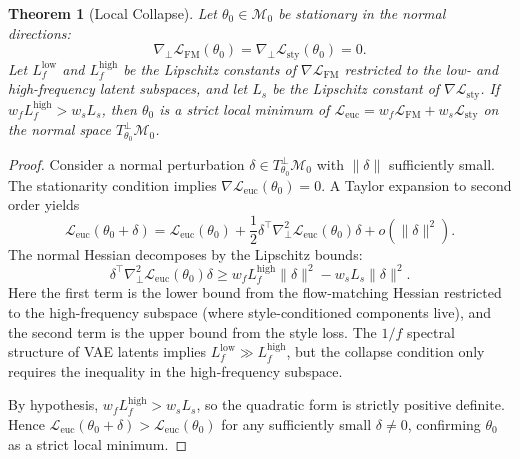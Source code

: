 \documentclass[letterpaper]{article}
\newtheorem{theorem}{Theorem}
\begin{document}
\begin{theorem}[Local Collapse]
Let $\theta_0 \in \mathcal{M}_0$ be stationary in the normal directions:
\begin{equation}
\nabla_\perp \mathcal{L}_{\mathrm{FM}}(\theta_0)=\nabla_\perp \mathcal{L}_{\mathrm{sty}}(\theta_0)=0.
\end{equation}
Let $L_f^{\mathrm{low}}$ and $L_f^{\mathrm{high}}$ be the Lipschitz constants of $\nabla\mathcal{L}_{\mathrm{FM}}$ restricted to the low- and high-frequency latent subspaces, and let $L_s$ be the Lipschitz constant of $\nabla\mathcal{L}_{\mathrm{sty}}$.
If $w_f L_f^{\mathrm{high}} > w_s L_s$, then $\theta_0$ is a strict local minimum of $\mathcal{L}_{\mathrm{euc}} = w_f \mathcal{L}_{\mathrm{FM}} + w_s \mathcal{L}_{\mathrm{sty}}$ on the normal space $T^{\perp}_{\theta_0}\mathcal{M}_0$.
\end{theorem}

\begin{proof}
Consider a normal perturbation $\delta \in T^{\perp}_{\theta_0}\mathcal{M}_0$ with $\|\delta\|$ sufficiently small. The stationarity condition implies $\nabla\mathcal{L}_{\mathrm{euc}}(\theta_0)=0$. A Taylor expansion to second order yields
\begin{equation}
\mathcal{L}_{\mathrm{euc}}(\theta_0+\delta) = \mathcal{L}_{\mathrm{euc}}(\theta_0) + \frac{1}{2}\delta^\top \nabla^2_\perp \mathcal{L}_{\mathrm{euc}}(\theta_0)\delta + o(\|\delta\|^2).
\end{equation}
The normal Hessian decomposes by the Lipschitz bounds:
\begin{equation}
\delta^\top \nabla^2_\perp \mathcal{L}_{\mathrm{euc}}(\theta_0)\delta \ge w_f L_f^{\mathrm{high}} \|\delta\|^2 - w_s L_s \|\delta\|^2.
\end{equation}
Here the first term is the lower bound from the flow-matching Hessian restricted to the high-frequency subspace (where style-conditioned components live), and the second term is the upper bound from the style loss. The $1/f$ spectral structure of VAE latents implies $L_f^{\mathrm{low}} \gg L_f^{\mathrm{high}}$, but the collapse condition only requires the inequality in the high-frequency subspace.

By hypothesis, $w_f L_f^{\mathrm{high}} > w_s L_s$, so the quadratic form is strictly positive definite. Hence $\mathcal{L}_{\mathrm{euc}}(\theta_0+\delta) > \mathcal{L}_{\mathrm{euc}}(\theta_0)$ for any sufficiently small $\delta \neq 0$, confirming $\theta_0$ as a strict local minimum.
\end{proof}
\end{document}
